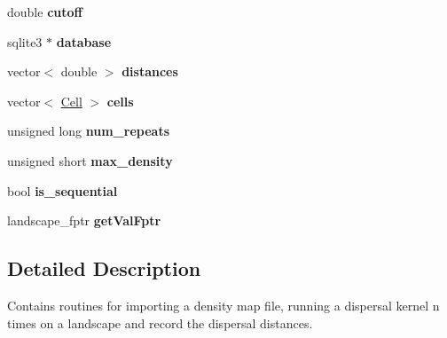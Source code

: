 \begin{DoxyCompactItemize}
\item 
double {\bfseries cutoff}\hypertarget{class_simulate_dispersal_a532f1c5ba22d681c5761dcce4fc8555d}{}\label{class_simulate_dispersal_a532f1c5ba22d681c5761dcce4fc8555d}

\item 
sqlite3 $\ast$ {\bfseries database}\hypertarget{class_simulate_dispersal_afd3f96f169715aacbcc2939614a6a910}{}\label{class_simulate_dispersal_afd3f96f169715aacbcc2939614a6a910}

\item 
vector$<$ double $>$ {\bfseries distances}\hypertarget{class_simulate_dispersal_a616354e9527a71396a428bb63f444a15}{}\label{class_simulate_dispersal_a616354e9527a71396a428bb63f444a15}

\item 
vector$<$ \hyperlink{struct_cell}{Cell} $>$ {\bfseries cells}\hypertarget{class_simulate_dispersal_abcb3ce61b835cbd007d09726302d692a}{}\label{class_simulate_dispersal_abcb3ce61b835cbd007d09726302d692a}

\item 
unsigned long {\bfseries num\+\_\+repeats}\hypertarget{class_simulate_dispersal_a36ca3df92a79e284cdeb84ea0dfb3c9a}{}\label{class_simulate_dispersal_a36ca3df92a79e284cdeb84ea0dfb3c9a}

\item 
unsigned short {\bfseries max\+\_\+density}\hypertarget{class_simulate_dispersal_a24589094c95d4f594c1c58f3eb9bfdb7}{}\label{class_simulate_dispersal_a24589094c95d4f594c1c58f3eb9bfdb7}

\item 
bool {\bfseries is\+\_\+sequential}\hypertarget{class_simulate_dispersal_a72f4b5ec8d52f080f2c9df991fb546ef}{}\label{class_simulate_dispersal_a72f4b5ec8d52f080f2c9df991fb546ef}

\item 
landscape\+\_\+fptr {\bfseries get\+Val\+Fptr}\hypertarget{class_simulate_dispersal_ae1f3a40b1805f024e41ec8df9c38c01e}{}\label{class_simulate_dispersal_ae1f3a40b1805f024e41ec8df9c38c01e}

\end{DoxyCompactItemize}


\subsection{Detailed Description}
Contains routines for importing a density map file, running a dispersal kernel n times on a landscape and record the dispersal distances. 

